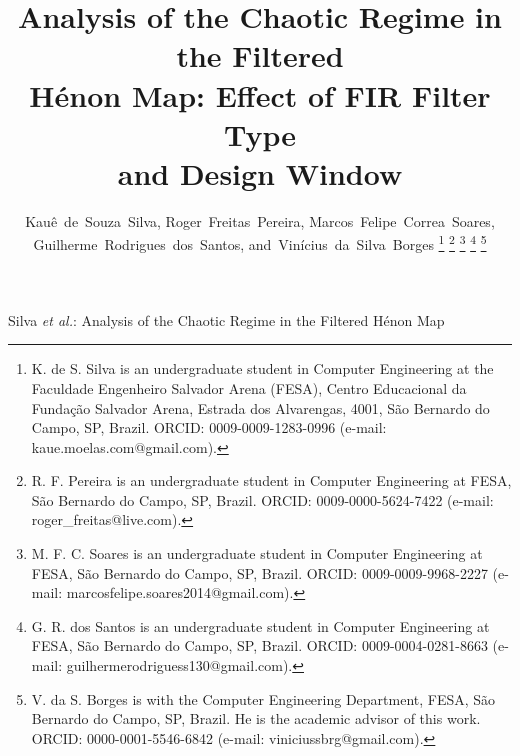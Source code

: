 \documentclass[journal]{IEEEtran}
\begin{document}
\title{Analysis of the Chaotic Regime in the Filtered\\ H\'enon Map: Effect of FIR Filter Type\\ and Design Window}

\author{Kau\^e~de~Souza~Silva,
        Roger~Freitas~Pereira,
        Marcos~Felipe~Correa~Soares,
        Guilherme~Rodrigues~dos~Santos,
        and~Vin\'icius~da~Silva~Borges%
\thanks{K. de S. Silva is an undergraduate student in Computer Engineering
at the Faculdade Engenheiro Salvador Arena (FESA), Centro Educacional da
Funda\c{c}\~ao Salvador Arena, Estrada dos Alvarengas, 4001, S\~ao Bernardo
do Campo, SP, Brazil. ORCID: 0009-0009-1283-0996 (e-mail:
kaue.moelas.com@gmail.com).}%
\thanks{R. F. Pereira is an undergraduate student in Computer Engineering
at FESA, S\~ao Bernardo do Campo, SP, Brazil. ORCID: 0009-0000-5624-7422
(e-mail: roger\_freitas@live.com).}%
\thanks{M. F. C. Soares is an undergraduate student in Computer Engineering
at FESA, S\~ao Bernardo do Campo, SP, Brazil. ORCID: 0009-0009-9968-2227
(e-mail: marcosfelipe.soares2014@gmail.com).}%
\thanks{G. R. dos Santos is an undergraduate student in Computer Engineering
at FESA, S\~ao Bernardo do Campo, SP, Brazil. ORCID: 0009-0004-0281-8663
(e-mail: guilhermerodriguess130@gmail.com).}%
\thanks{V. da S. Borges is with the Computer Engineering Department, FESA,
S\~ao Bernardo do Campo, SP, Brazil. He is the academic advisor of this
work. ORCID: 0000-0001-5546-6842 (e-mail: viniciussbrg@gmail.com).}%
}

%
{Silva \MakeLowercase{\textit{et al.}}: Analysis of the Chaotic Regime in the Filtered H\'enon Map}

\maketitle
\end{document}
